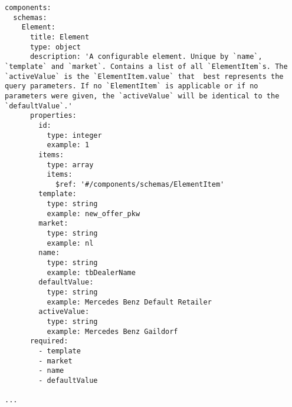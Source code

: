 \begin{lstlisting}
components:
  schemas:
    Element:
      title: Element
      type: object
      description: 'A configurable element. Unique by `name`, `template` and `market`. Contains a list of all `ElementItem`s. The `activeValue` is the `ElementItem.value` that  best represents the query parameters. If no `ElementItem` is applicable or if no parameters were given, the `activeValue` will be identical to the `defaultValue`.'
      properties:
        id:
          type: integer
          example: 1
        items:
          type: array
          items:
            $ref: '#/components/schemas/ElementItem'
        template:
          type: string
          example: new_offer_pkw
        market:
          type: string
          example: nl
        name:
          type: string
          example: tbDealerName
        defaultValue:
          type: string
          example: Mercedes Benz Default Retailer
        activeValue:
          type: string
          example: Mercedes Benz Gaildorf
      required:
        - template
        - market
        - name
        - defaultValue

...
\end{lstlisting}
